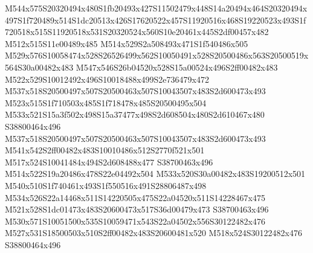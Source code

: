 \documentclass{article}
\begin{document}
\begin{multicols}{2}



M544x575S20320494x480S1fb20493x427S11502479x448S14a20494x464S20320494x497S1f720489x514S1dc20513x426S17620522x457S11920516x468S19220523x493S1f720518x515S11920518x531S20320524x560S10e20461x445S2df00457x482 M512x515S11e00489x485 M514x529S2a508493x471S1f540486x505 M529x576S10058474x528S26526499x562S10050491x528S20500486x563S20500519x564S30a00482x483 M547x546S26b04520x528S15a00524x496S2ff00482x483 M522x529S10012492x496S10018488x499S2e736479x472 M537x518S20500497x507S20500463x507S10043507x483S2d600473x493 M523x515S1f710503x485S1f718478x485S20500495x504 M533x521S15a3f502x498S15a37477x498S2d608504x480S2d610467x480 S38800464x496 M537x518S20500497x507S20500463x507S10043507x483S2d600473x493 M541x542S2ff00482x483S10010486x512S2770f521x501 M517x524S10041484x494S2d608488x477 S38700463x496 M514x522S19a20486x478S22e04492x504 M533x520S30a00482x483S19200512x501 M540x510S1f740461x493S1f550516x491S28806487x498 M534x526S22a14468x511S14220505x475S22a04520x511S14228467x475 M521x528S1dc01473x483S20600473x517S36d00479x473 S38700463x496 M530x571S10051500x535S10059471x543S22a04502x556S30122482x476 M527x531S18500503x510S2ff00482x483S20600481x520 M518x524S30122482x476 S38800464x496









\end{multicols}
\end{document}

